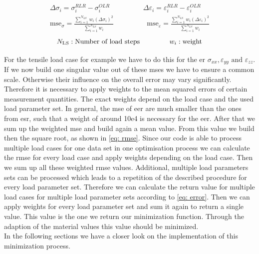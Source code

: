     \begin{center}
        \begin{gather}
            \label{eq: EMDifference}
            \Delta\sigma_{i} = \sigma_{i}^{\scriptscriptstyle RLR} - \sigma_{i}^{\scriptscriptstyle OLR} \hspace{2cm}
            \Delta\varepsilon_{i} = \varepsilon_{i}^{\scriptscriptstyle RLR} - \varepsilon_{i}^{\scriptscriptstyle OLR}\\
            \label{eq: mse}
            \text{mse}_{\sigma} = \frac{\displaystyle\sum_{i=1}^{N_{LS}} w_i (\Delta\sigma_{i})^2}{\displaystyle\sum_{i=1}^{N_{LS}}w_i } \hspace{2cm}
            \text{mse}_{\varepsilon} = \frac{\displaystyle\sum_{i=1}^{N_{LS}} w_i (\Delta\varepsilon_{i})^2}{\displaystyle\sum_{i=1}^{N_{LS}}w_i }
        \end{gather}
        \begin{equation*}
            N_{\text{LS}}: \text{Number of load steps}
            \hspace{1.5cm}
            w_i : \text{weight}
        \end{equation*}
    \end{center}
    
    
    
    For the tensile load case for example we have to do this for the \acrlong{er} $\sigma_{xx}, \varepsilon_{yy} \text{ and } \varepsilon_{zz}$. 
    If we now build one singular value out of these \acrshort{mse}s we have to ensure a common scale. Otherwise their influence on the overall error may vary significantly. Therefore it is necessary to apply weights to the mean squared errors of certain measurement quantities. The exact weights depend on the load case and the used load parameter set. In general, the \acrshort{mse} of \acrfull{eer} are much smaller than the ones from \acrfull{esr}, such that a weight of around 10e4 is necessary for the \acrshort{eer}. After that we sum up the weighted \acrshort{mse} and build again a mean value. From this value we build then the square root, as shown in \autoref{eq: rmse}. Since our code is able to process multiple load cases for one data set in one optimisation process we can calculate the \acrshort{rmse} for every load case and apply weights depending on the load case. Then we sum up all these weighted \acrshort{rmse} values. Additional, multiple load parameters sets can be processed which leads to a repetition of the described procedure for every load parameter set. Therefore we can calculate the return value for multiple load cases for multiple load parameter sets according to \autoref{eq: error}. Then we can apply weights for every load parameter set and sum it again to return a single value. This value is the one we return our minimization function. Through the adaption of the material values this value should be minimized. \\
    In the following sections we have a closer look on the implementation of this minimization process. 

